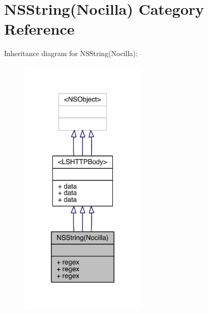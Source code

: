 \hypertarget{category_n_s_string_07_nocilla_08}{\section{N\-S\-String(Nocilla) Category Reference}
\label{category_n_s_string_07_nocilla_08}
}


Inheritance diagram for N\-S\-String(Nocilla)\-:\nopagebreak
\begin{figure}[H]
\begin{center}
\leavevmode
\includegraphics[width=172pt]{category_n_s_string_07_nocilla_08__inherit__graph}
\end{center}
\end{figure}


